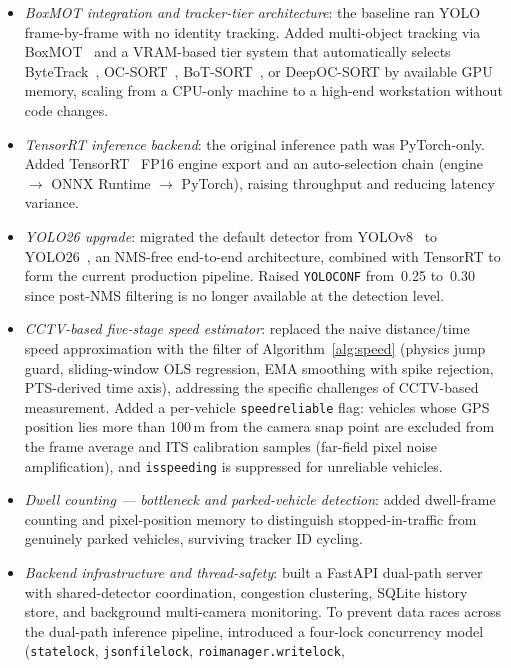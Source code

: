 \documentclass[conference]{IEEEtran}
\renewcommand{\_}{\textunderscore\allowbreak}
\begin{document}
\begin{itemize}
  \item \emph{BoxMOT integration and tracker-tier architecture}:
  the baseline ran YOLO frame-by-frame with no identity tracking.
  Added multi-object tracking via BoxMOT~\cite{boxmot} and a VRAM-based tier
  system that automatically selects ByteTrack~\cite{bytetrack},
  OC-SORT~\cite{ocsort}, BoT-SORT~\cite{botsort}, or DeepOC-SORT by available
  GPU memory, scaling from a CPU-only machine to a high-end workstation without
  code changes.
  \item \emph{TensorRT inference backend}:
  the original inference path was PyTorch-only. Added TensorRT~\cite{tensorrt}
  FP16 engine export and an auto-selection chain
  (engine $\to$ ONNX Runtime $\to$ PyTorch), raising throughput and reducing
  latency variance.
  \item \emph{YOLO26 upgrade}:
  migrated the default detector from YOLOv8~\cite{yolov8} to
  YOLO26~\cite{yolo26}, an NMS-free end-to-end architecture, combined with
  TensorRT to form the current production pipeline. Raised \texttt{YOLO\_CONF}
  from~0.25 to~0.30 since post-NMS filtering is no longer available at the
  detection level.
  \item \emph{CCTV-based five-stage speed estimator}:
  replaced the naive distance/time speed approximation with the filter of
  Algorithm~\ref{alg:speed} (physics jump guard, sliding-window OLS regression,
  EMA smoothing with spike rejection, PTS-derived time axis), addressing the
  specific challenges of CCTV-based measurement.
  Added a per-vehicle \texttt{speed\_reliable} flag: vehicles whose GPS position
  lies more than 100\,m from the camera snap point are excluded from the frame
  average and ITS calibration samples (far-field pixel noise amplification), and
  \texttt{is\_speeding} is suppressed for unreliable vehicles.
  \item \emph{Dwell counting --- bottleneck and parked-vehicle detection}:
  added dwell-frame counting and pixel-position memory to distinguish
  stopped-in-traffic from genuinely parked vehicles, surviving tracker ID
  cycling.
  \item \emph{Backend infrastructure and thread-safety}:
  built a FastAPI dual-path server with shared-detector coordination, congestion
  clustering, SQLite history store, and background multi-camera monitoring. To
  prevent data races across the dual-path inference pipeline, introduced a
  four-lock concurrency model (\texttt{\_state\_lock},
  \texttt{\_json\_file\_lock}, \texttt{roi\_manager.\_write\_lock},

\end{itemize}
\end{document}
